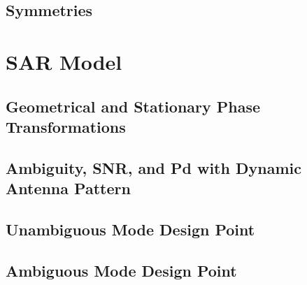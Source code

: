 \documentclass[11pt, a4paper]{scrartcl}
\begin{document}
    \subsection{Symmetries}
    \label{subsec:symmetries}


    \section{SAR Model}
    \label{sec:sar_model}

    \subsection{Geometrical and Stationary Phase Transformations}
    \label{subsec:transformations}

    \subsection{Ambiguity, SNR, and Pd with Dynamic Antenna Pattern}
    \label{subsec:ambiguity_snr_pd_with_dynamic_antenna_pattern}

    \subsection{Unambiguous Mode Design Point}
    \label{subsec:unambiguous_mode_design_point}

    \subsection{Ambiguous Mode Design Point}
    \label{subsec:ambiguous_mode_design_point}

    
    
\end{document}
